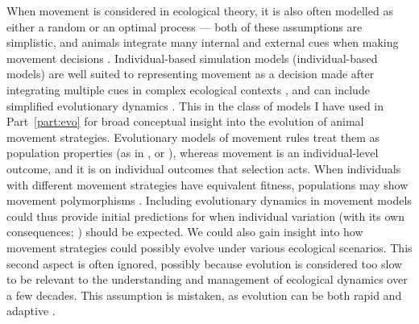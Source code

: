 When movement is considered in ecological theory, it is also often modelled as either a random or an optimal process --- both of these assumptions are simplistic, and animals integrate many internal and external cues when making movement decisions \citep{nathan2008a}.
Individual-based simulation models (individual-based models) are well suited to representing movement as a decision made after integrating multiple cues in complex ecological contexts \citep{huston1988,deangelis2019}, and can include simplified evolutionary dynamics \citep{getz2015,getz2016,netz2021}.
This in the class of models I have used in Part~\ref{part:evo} for broad conceptual insight into the evolution of animal movement strategies.
Evolutionary models of movement rules treat them as population properties (as in \cite*[]{dejager2011,dejager2020}, or \cite*[]{morris2011}), whereas movement is an individual-level outcome, and it is on individual outcomes that selection acts.
When individuals with different movement strategies have equivalent fitness, populations may show movement polymorphisms \citep{wolf2012,shaw2020,getz2015}.
Including evolutionary dynamics in movement models could thus provide initial predictions for when individual variation (with its own consequences; \cite{spiegel2017}) should be expected.
We could also gain insight into how movement strategies could possibly evolve under various ecological scenarios.
This second aspect is often ignored, possibly because evolution is considered too slow to be relevant to the understanding and management of ecological dynamics over a few decades.
This assumption is mistaken, as evolution can be both rapid and adaptive \citep[][]{bonnet2022}.


